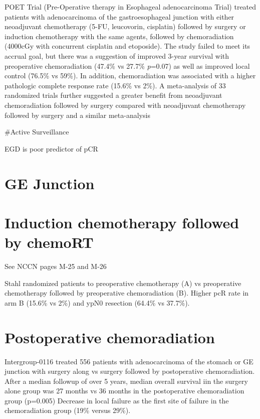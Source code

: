 \documentclass[
]{book}
\begin{document}
POET Trial (Pre-Operative therapy in Esophageal adenocarcinoma Trial) treated patients with adenocarcinoma of the gastroesophageal junction with either neoadjuvant chemotherapy (5-FU, leucovorin, cisplatin) followed by surgery or induction chemotherapy with the same agents, followed by chemoradiation (4000cGy with concurrent cisplatin and etoposide). The study failed to meet its accrual goal, but there was a suggestion of improved 3-year survival with preoperative chemoradiation (47.4\% vs 27.7\% \emph{p}=0.07) as well as improved local control (76.5\% vs 59\%). In addition, chemoradiation was associated with a higher pathologic complete response rate (15.6\% vs 2\%)\citep{stahl851}. A meta-analysis of 33 randomized trials further suggested a greater benefit from neoadjuvant chemoradiation followed by surgery compared with neoadjuvant chemotherapy followed by surgery\citep{pasquali481} and a similar meta-analysis \citep{sjoquist681}

\#Active Surveillance

EGD is poor predictor of pCR \citep{sarkaria764}

\hypertarget{ge-junction}{%
\section{GE Junction}\label{ge-junction}}

\citep{siewert260}

\hypertarget{induction-chemotherapy-followed-by-chemort}{%
\section{Induction chemotherapy followed by chemoRT}\label{induction-chemotherapy-followed-by-chemort}}

See NCCN pages M-25 and M-26

Stahl \citep{stahl851} randomized patients to preoperative chemotherapy (A) vs preoperative chemotherapy followed by preoperative chemoradiation (B). Higher pcR rate in arm B (15.6\% vs 2\%) and ypN0 resection (64.4\% vs 37.7\%).

\hypertarget{postoperative-chemoradiation}{%
\section{Postoperative chemoradiation}\label{postoperative-chemoradiation}}

Intergroup-0116 \citep{macdonald725} \citep{smalley2327} treated 556 patients with adenocarcinoma of the stomach or GE junction with surgery along vs surgery followed by postoperative chemoradiation. After a median followup of over 5 years, median overall survival iin the surgery alone group was 27 months vs 36 months in the postoperative chemoradiation group (p=0.005) Decrease in local failure as the first site of failure in the chemoradiation group (19\% versus 29\%).
\end{document}
